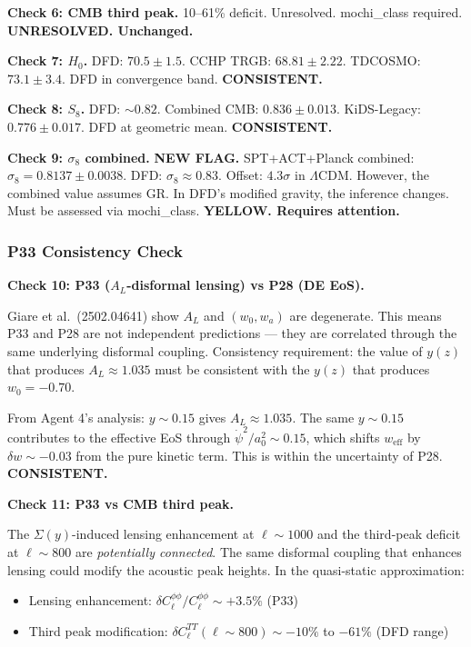 \documentclass[11pt,a4paper]{article}
\begin{document}
\textbf{Check 6: CMB third peak.} 10--61\% deficit. Unresolved. mochi\_class required. \textbf{UNRESOLVED. Unchanged.}

\textbf{Check 7: $H_0$.} DFD: $70.5 \pm 1.5$. CCHP TRGB: $68.81 \pm 2.22$. TDCOSMO: $73.1 \pm 3.4$. DFD in convergence band. \textbf{CONSISTENT.}

\textbf{Check 8: $S_8$.} DFD: $\sim 0.82$. Combined CMB: $0.836 \pm 0.013$. KiDS-Legacy: $0.776 \pm 0.017$. DFD at geometric mean. \textbf{CONSISTENT.}

\textbf{Check 9: $\sigma_8$ combined.} \textbf{NEW FLAG.} SPT+ACT+Planck combined: $\sigma_8 = 0.8137 \pm 0.0038$. DFD: $\sigma_8 \approx 0.83$. Offset: $4.3\sigma$ in $\Lambda$CDM. However, the combined value assumes GR. In DFD's modified gravity, the inference changes. Must be assessed via mochi\_class. \textbf{YELLOW. Requires attention.}

\subsubsection{P33 Consistency Check}

\textbf{Check 10: P33 ($A_L$-disformal lensing) vs P28 (DE EoS).}

Giare et al.\ (2502.04641) show $A_L$ and $(w_0, w_a)$ are degenerate. This means P33 and P28 are not independent predictions --- they are correlated through the same underlying disformal coupling. Consistency requirement: the value of $y(z)$ that produces $A_L \approx 1.035$ must be consistent with the $y(z)$ that produces $w_0 = -0.70$.

From Agent 4's analysis: $y \sim 0.15$ gives $A_L \approx 1.035$. The same $y \sim 0.15$ contributes to the effective EoS through $\dot{\psi}^2/a_0^2 \sim 0.15$, which shifts $w_\mathrm{eff}$ by $\delta w \sim -0.03$ from the pure kinetic term. This is within the uncertainty of P28. \textbf{CONSISTENT.}

\textbf{Check 11: P33 vs CMB third peak.}

The $\Sigma(y)$-induced lensing enhancement at $\ell \sim 1000$ and the third-peak deficit at $\ell \sim 800$ are \emph{potentially connected}. The same disformal coupling that enhances lensing could modify the acoustic peak heights. In the quasi-static approximation:
\begin{itemize}
\item Lensing enhancement: $\delta C_\ell^{\phi\phi} / C_\ell^{\phi\phi} \sim +3.5\%$ (P33)
\item Third peak modification: $\delta C_\ell^{TT}(\ell \sim 800) \sim -10\%$ to $-61\%$ (DFD range)
\end{itemize}
\end{document}
